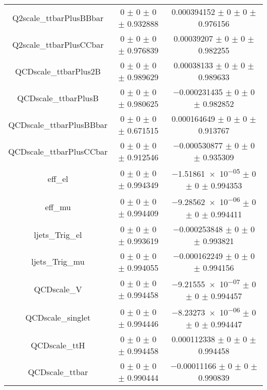 \begin{table}
\begin{tabular}{ccc}
Q2scale\_ttbarPlusBBbar & \num{0} $\pm$ \num{0} $\pm$ \num{0} $\pm$ \num{0.932888} & \num{0.000394152} $\pm$ \num{0} $\pm$ \num{0} $\pm$ \num{0.976156}\\
Q2scale\_ttbarPlusCCbar & \num{0} $\pm$ \num{0} $\pm$ \num{0} $\pm$ \num{0.976839} & \num{0.00039207} $\pm$ \num{0} $\pm$ \num{0} $\pm$ \num{0.982255}\\
QCDscale\_ttbarPlus2B & \num{0} $\pm$ \num{0} $\pm$ \num{0} $\pm$ \num{0.989629} & \num{0.00038133} $\pm$ \num{0} $\pm$ \num{0} $\pm$ \num{0.989633}\\
QCDscale\_ttbarPlusB & \num{0} $\pm$ \num{0} $\pm$ \num{0} $\pm$ \num{0.980625} & \num{-0.000231435} $\pm$ \num{0} $\pm$ \num{0} $\pm$ \num{0.982852}\\
QCDscale\_ttbarPlusBBbar & \num{0} $\pm$ \num{0} $\pm$ \num{0} $\pm$ \num{0.671515} & \num{0.000164649} $\pm$ \num{0} $\pm$ \num{0} $\pm$ \num{0.913767}\\
QCDscale\_ttbarPlusCCbar & \num{0} $\pm$ \num{0} $\pm$ \num{0} $\pm$ \num{0.912546} & \num{-0.000530877} $\pm$ \num{0} $\pm$ \num{0} $\pm$ \num{0.935309}\\
eff\_el & \num{0} $\pm$ \num{0} $\pm$ \num{0} $\pm$ \num{0.994349} & \num{-1.51861e-05} $\pm$ \num{0} $\pm$ \num{0} $\pm$ \num{0.994353}\\
eff\_mu & \num{0} $\pm$ \num{0} $\pm$ \num{0} $\pm$ \num{0.994409} & \num{-9.28562e-06} $\pm$ \num{0} $\pm$ \num{0} $\pm$ \num{0.994411}\\
ljets\_Trig\_el & \num{0} $\pm$ \num{0} $\pm$ \num{0} $\pm$ \num{0.993619} & \num{-0.000253848} $\pm$ \num{0} $\pm$ \num{0} $\pm$ \num{0.993821}\\
ljets\_Trig\_mu & \num{0} $\pm$ \num{0} $\pm$ \num{0} $\pm$ \num{0.994055} & \num{-0.000162249} $\pm$ \num{0} $\pm$ \num{0} $\pm$ \num{0.994156}\\
QCDscale\_V & \num{0} $\pm$ \num{0} $\pm$ \num{0} $\pm$ \num{0.994458} & \num{-9.21555e-07} $\pm$ \num{0} $\pm$ \num{0} $\pm$ \num{0.994457}\\
QCDscale\_singlet & \num{0} $\pm$ \num{0} $\pm$ \num{0} $\pm$ \num{0.994446} & \num{-8.23273e-06} $\pm$ \num{0} $\pm$ \num{0} $\pm$ \num{0.994447}\\
QCDscale\_ttH & \num{0} $\pm$ \num{0} $\pm$ \num{0} $\pm$ \num{0.994458} & \num{0.000112338} $\pm$ \num{0} $\pm$ \num{0} $\pm$ \num{0.994458}\\
QCDscale\_ttbar & \num{0} $\pm$ \num{0} $\pm$ \num{0} $\pm$ \num{0.990444} & \num{-0.00011166} $\pm$ \num{0} $\pm$ \num{0} $\pm$ \num{0.990839}\\

\end{tabular}
\end{table}
